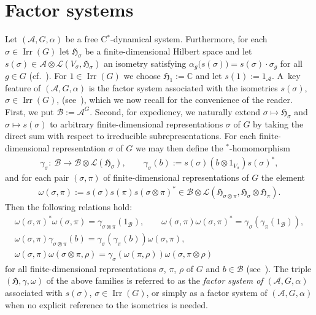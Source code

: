 \documentclass[11pt]{article}
\numberwithin{equation}{section}
\numberwithin{equation}{section}
\newcommand*{\C}{\mathbb C}		%
\newcommand*{\tensor}{\otimes}		%
\newcommand*{\Star}{$^*$\nobreakdash}
\newcommand*{\hilb}{\mathfrak}		%
\newcommand*{\alg}{\mathcal}		%
\newcommand*{\hH}{\hilb{H}}			%
\newcommand*{\one}{1}				%
\newcommand*{\aA}{\alg{A}}			%
\newcommand*{\aB}{\alg{B}} 			%
\newcommand*{\End}{\mathcal{L}} %
\DeclareMathOperator{\Irrep}{Irr} 			%
\begin{document}
\section{Factor systems}\label{sec:facsys}

Let $(\aA,G,\alpha)$ be a free C\Star-dynamical system.
Furthermore, for each $\sigma \in \Irrep(G)$ let $\hH_\sigma$ be a finite-dimensional Hilbert space and let $s(\sigma) \in \aA \tensor \End(V_\sigma,\hH_\sigma)$ an isometry satisfying $\alpha_g\bigl(s(\sigma)\bigr)=s(\sigma) \cdot \sigma_g$ for all $g \in G$ (cf.~\cite[Lemma~3.3]{SchWa17c}).
For $1 \in \Irrep(G)$ we choose $\hH_1 := \C$ and let $s(1) := \one_\aA$.
A~key feature of $(\aA,G,\alpha)$ is the factor system associated with the isometries $s(\sigma)$, $\sigma \in \Irrep(G)$, (see~\cite[Definition~4.1]{SchWa17c}), which we now recall for the convenience of the reader.
First, we put $\aB := \aA^G$.
Second, for expediency, we naturally extend $\sigma \mapsto \hH_\sigma$ and $\sigma \mapsto s(\sigma)$ to arbitrary finite-dimensional representations $\sigma$ of $G$ by taking the direct sum with respect to irreducible subrepresentations.
For each finite-dimensional representation $\sigma$ of $G$ we may then define the \Star-homomorphism
\begin{gather*}
	\gamma_\sigma\colon \ \aB \to \aB \otimes \End(\hH_\sigma),
	\qquad
	\gamma_\sigma(b) := s(\sigma) (b \tensor \one_{V_\sigma}) s(\sigma)^*,
\end{gather*}
and for each pair $(\sigma,\pi)$ of finite-dimensional representations of $G$ the element
\begin{gather*}
	\omega(\sigma,\pi) := s(\sigma) s(\pi) s(\sigma \tensor \pi)^* \in \aB \tensor \End(\hH_{\sigma \tensor \pi},\hH_\sigma \tensor \hH_\pi).
\end{gather*}
Then the following relations hold:
\begin{gather}
	\label{eq:ranges_sys}
	\omega(\sigma,\pi)^* \omega(\sigma,\pi) = \gamma_{\sigma \tensor \pi}(\one_\aB),
	\qquad
	\omega(\sigma,\pi) \omega(\sigma,\pi)^* = \gamma_\sigma (\gamma_\pi(\one_\aB) ),
	\\
	\label{eq:coaction_sys}
	\omega(\sigma, \pi) \gamma_{\sigma \tensor \pi}(b) = \gamma_\sigma( \gamma_\pi(b) ) \omega(\sigma, \pi),
	\\
	\label{eq:cocycle_sys}
	\omega(\sigma, \pi) \omega(\sigma \tensor \pi, \rho)
		= \gamma_\sigma ( \omega(\pi, \rho) ) \omega(\sigma, \pi \tensor \rho)
\end{gather}
for all finite-dimensional representations $\sigma$, $\pi$, $\rho$ of $G$ and $b \in \aB$ (see~\cite[Lemma~4.3]{SchWa20}).
The triple $(\hH, \gamma, \omega)$ of the above families is referred to as the \emph{factor system of $(\aA, G, \alpha)$} associated with $s(\sigma)$, $\sigma \in \Irrep(G)$, or simply as a factor system of $(\aA, G, \alpha)$ when no explicit reference to the isometries is needed.
\end{document}
